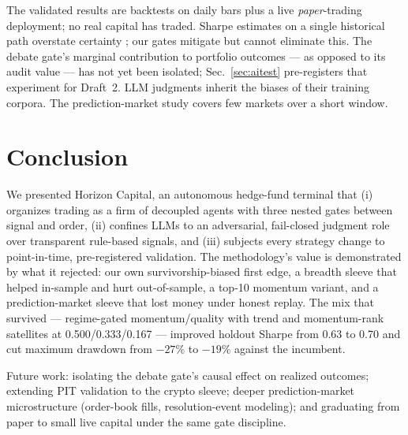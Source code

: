 \documentclass[10pt,twocolumn]{IEEEtran}
\begin{document}
The validated results are backtests on daily bars plus a live
\emph{paper}-trading deployment; no real capital has traded. Sharpe
estimates on a single historical path overstate certainty
\cite{bailey2014deflated}; our gates mitigate but cannot eliminate this.
The debate gate's marginal contribution to portfolio outcomes --- as opposed
to its audit value --- has not yet been isolated; Sec.~\ref{sec:aitest}
pre-registers that experiment for Draft~2. LLM judgments inherit the biases
of their training corpora.
The prediction-market study covers few markets over a short window.

\section{Conclusion}

We presented Horizon Capital, an autonomous hedge-fund terminal that (i)
organizes trading as a firm of decoupled agents with three nested gates
between signal and order, (ii) confines LLMs to an adversarial,
fail-closed judgment role over transparent rule-based signals, and (iii)
subjects every strategy change to point-in-time, pre-registered validation.
The methodology's value is demonstrated by what it rejected: our own
survivorship-biased first edge, a breadth sleeve that helped in-sample and
hurt out-of-sample, a top-10 momentum variant, and a prediction-market
sleeve that lost money under honest replay. The mix that survived ---
regime-gated momentum/quality with trend and momentum-rank satellites at
0.500/0.333/0.167 --- improved holdout Sharpe from 0.63 to 0.70 and cut
maximum drawdown from $-27\%$ to $-19\%$ against the incumbent.

Future work: isolating the debate gate's causal effect on realized
outcomes; extending PIT validation to the crypto sleeve; deeper
prediction-market microstructure (order-book fills, resolution-event
modeling); and graduating from paper to small live capital under the same
gate discipline.
\end{document}
